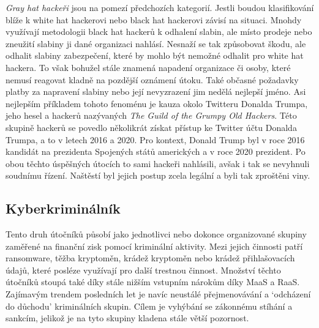 \textit{Gray hat hackeři} jsou na pomezí předchozích kategorií.
Jestli boudou klasifikování blíže k white hat hackerovi nebo black hat hackerovi závisí na situaci.
Mnohdy využívají metodologii black hat hackerů k odhalení slabin, ale místo prodeje nebo zneužití slabiny ji dané organizaci nahlásí.
Nesnaží se tak způsobovat škodu, ale odhalit slabiny zabezpečení, které by mohlo být nemožné odhalit pro white hat hackera.
To však bohužel stále znamená napadení organizace či osoby, které nemusí reagovat kladně na pozdější oznámení útoku.
Také občasné požadavky platby za napravení slabiny nebo její nevyzrazení jim nedělá nejlepší jméno.
Asi nejlepším příkladem tohoto fenoménu je kauza okolo Twitteru Donalda Trumpa, jeho hesel a hackerů nazývaných \textit{The Guild of the Grumpy Old Hackers}\cite{darknet_87_grumpy}.
Této skupině hackerů se povedlo několikrát získat přístup ke Twitter účtu Donalda Trumpa, a to v letech 2016 a 2020.
Pro kontext, Donald Trump byl v roce 2016 kandidát na prezidenta Spojených států amerických a v roce 2020 prezident.
Po obou těchto úspěšných útocích to sami hackeři nahlásili, avšak i tak se nevyhnuli soudnímu řízení.
Naštěstí byl jejich postup zcela legální a byli tak zproštěni viny.

\subsection{Kyberkriminálník}\label{subsec:cyber-kriminalnik}
Tento druh útočníků působí jako jednotlivci nebo dokonce organizované skupiny zaměřené na finanční zisk pomocí kriminální aktivity.
Mezi jejich činnosti patří ransomware, těžba kryptoměn, krádež kryptoměn nebo krádež přihlašovacích údajů, které posléze využívají pro další trestnou činnost.
Množství těchto útočníků stoupá také díky stále nižším vstupním nárokům díky \ac{MaaS}\cite{MaaS_ATaT} a \ac{RaaS}\cite{RaaS_microsoft}.
Zajímavým trendem posledních let je navíc neustálé přejmenovávání a `odcházení do důchodu' kriminálních skupin.
Cílem je vyhýbání se zákonnému stíhání a sankcím, jelikož je na tyto skupiny kladena stále větší pozornost.

